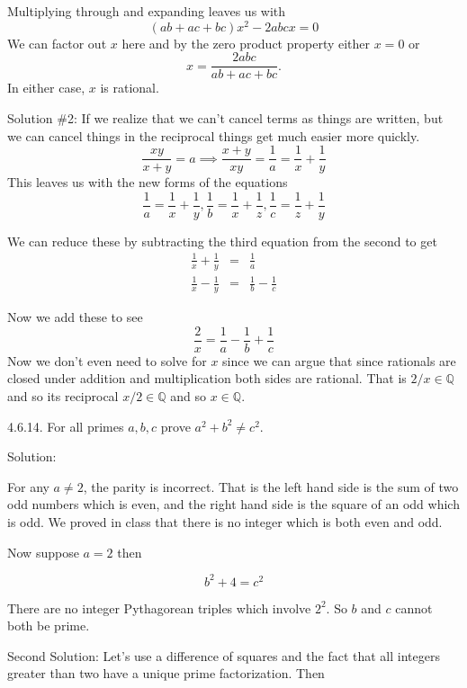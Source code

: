 \documentclass[16 pt]{amsart}
\theoremstyle{definition}
\theoremstyle{remark}
\numberwithin{equation}{subsection}
\newcommand{\Q}{\mathbb{Q}}
\begin{document}
Multiplying through and expanding leaves us with
\[
(ab+ac+bc)x^2 - 2abcx=0
\]
We can factor out $x$ here and by the zero product property either $x=0$ or
\[
x= \frac{2abc}{ab+ac+bc}.
\]
In either case, $x$ is rational.

\vspace{1in}

Solution \#2: If we realize that we can't cancel terms as things are written, but we can cancel things in the reciprocal things get much easier more quickly.
\[
\frac{xy}{x+y} = a \implies \frac{x+y}{xy} = \frac{1}{a} = \frac{1}{x} + \frac{1}{y}
\]
This leaves us with the new forms of the equations
\[
\frac{1}{a} = \frac{1}{x} + \frac{1}{y}, \frac{1}{b} = \frac{1}{x} + \frac{1}{z} , \frac{1}{c} = \frac{1}{z} + \frac{1}{y}
\]

We can reduce these by subtracting the third equation from the second to get
\begin{eqnarray*}
\frac{1}{x} + \frac{1}{y} & = & \frac{1}{a}\\
\frac{1}{x} - \frac{1}{y} & = & \frac{1}{b}- \frac{1}{c}
\end{eqnarray*}

Now we add these to see
\[
\frac{2}{x} = \frac{1}{a} - \frac{1}{b} + \frac{1}{c}
\]
Now we don't even need to solve for $x$ since we can argue that since rationals are closed under addition and multiplication both sides are rational. That is $2/x \in\Q$ and so its reciprocal $x/2\in\Q$ and so $x\in\Q$.


\newpage


4.6.14. For all primes $a,b,c$ prove $a^2+b^2 \neq c^2.$

\vspace{1in}


Solution:

For any $a\neq 2$, the parity is incorrect. That is the left hand side is the sum of two odd numbers which is even, and the right hand side is the square of an odd which is odd.  We proved in class that there is no integer which is both even and odd.

Now suppose $a=2$ then

\[
b^2 + 4 = c^2
\]

There are no integer Pythagorean triples which involve $2^2$.
So $b$ and $c$ cannot both be prime.

\vspace{1in}

Second Solution:  Let's use a difference of squares and the fact that all integers greater than two have a unique prime factorization.
Then
\end{document}
